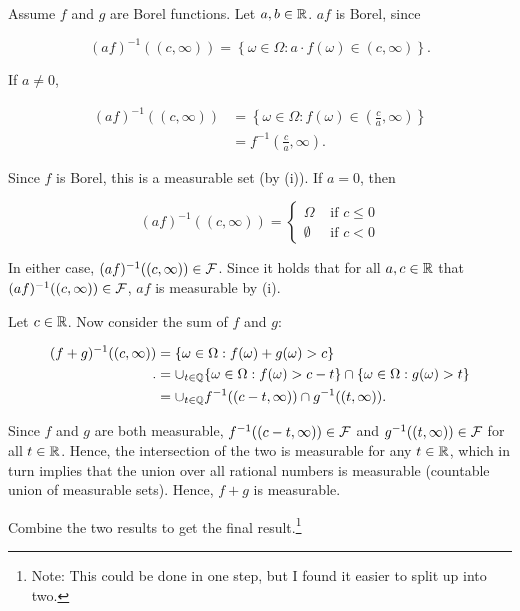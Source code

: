 \documentclass[]{book}
\let\rmarkdownfootnote\footnote%
\def\footnote{\protect\rmarkdownfootnote}
\theoremstyle{definition}
\theoremstyle{definition}
\theoremstyle{definition}
\theoremstyle{remark}
\let\BeginKnitrBlock\begin \let\EndKnitrBlock\end
\begin{document}
\BeginKnitrBlock{solution}[Ex 14 (ii)]
\iffalse{} {Solution (Ex 14 (ii)). } \fi{}Assume \(f\) and \(g\) are
Borel functions. Let \(a,b \in \mathbb{R}\). \(af\) is Borel, since

\[
  (af)^{-1}((c,\infty)) = \left\{ \omega \in \Omega : a\cdot f(\omega) \in (c, \infty) \right\}.
\]

If \(a \neq 0\),

\[\begin{aligned}
 (af)^{-1}((c,\infty)) &= \left\{ \omega \in \Omega : f(\omega) \in (\tfrac{c}{a}, \infty) \right\} \\
                       &= f^{-1}(\tfrac{c}{a}, \infty).
\end{aligned}\]

Since \(f\) is Borel, this is a measurable set (by (i)). If \(a = 0\),
then

\[(af)^{-1}((c,\infty)) = 
  \left\{ 
    \begin{matrix} 
      \Omega & \text{ if } c \le 0 \\ 
      \emptyset & \text{ if } c < 0 
    \end{matrix}
  \right .
\]

In either case, \((af)^{-1}((c, \infty)) \in \mathcal{F}\). Since it holds that
for all \(a,c \in \mathbb{R}\) that \((af)^{-1}((c,\infty)) \in \mathcal{F}\), \(af\) is
measurable by (i).

Let \(c \in \mathbb{R}\). Now consider the sum of \(f\) and \(g\):

\[\begin{aligned}
  (f + g)^{-1}((c, \infty)) &= \left\{ \omega \in \Omega : f(\omega) + g(\omega) > c \right\} \\.
                            &= \cup_{t \in \mathbb{Q}} \{\omega \in \Omega : f(\omega) > c - t \} \cap \{\omega \in \Omega : g(\omega) > t \} \\
                            &= \cup_{t \in \mathbb{Q}} f^{-1}((c-t, \infty)) \cap g^{-1}((t, \infty)).
\end{aligned}\]

Since \(f\) and \(g\) are both measurable,
\(f^{-1}((c-t, \infty)) \in \mathcal{F}\) and \(g^{-1}((t, \infty))\in \mathcal{F}\) for
all \(t \in \mathbb{R}\). Hence, the intersection of the two is measurable for
any \(t \in \mathbb{R}\), which in turn implies that the union over all rational
numbers is measurable (countable union of measurable sets). Hence,
\(f+g\) is measurable.

Combine the two results to get the final result.\footnote{Note: This
  could be done in one step, but I found it easier to split up into two.}
\EndKnitrBlock{solution}
\end{document}
